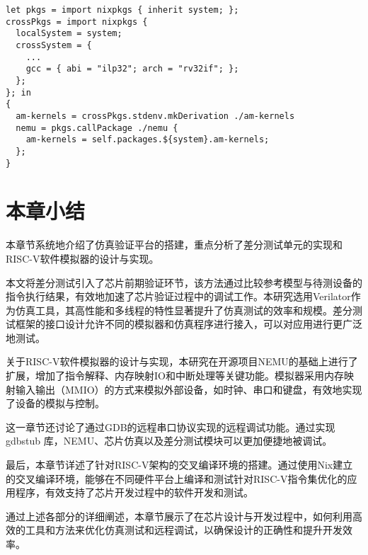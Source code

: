 \begin{lstlisting}[label={lst:nix},captionpos=b,caption={使用Nix管理跨架构依赖}]
let pkgs = import nixpkgs { inherit system; };
crossPkgs = import nixpkgs {
  localSystem = system;
  crossSystem = {
    ...
    gcc = { abi = "ilp32"; arch = "rv32if"; };
  };
}; in
{
  am-kernels = crossPkgs.stdenv.mkDerivation ./am-kernels
  nemu = pkgs.callPackage ./nemu { 
    am-kernels = self.packages.${system}.am-kernels;
  };
}
\end{lstlisting}

\section{本章小结}

本章节系统地介绍了仿真验证平台的搭建，重点分析了差分测试单元的实现和RISC-V软件模拟器的设计与实现。

本文将差分测试引入了芯片前期验证环节，该方法通过比较参考模型与待测设备的指令执行结果，有效地加速了芯片验证过程中的调试工作。本研究选用Verilator作为仿真工具，其高性能和多线程的特性显著提升了仿真测试的效率和规模。差分测试框架的接口设计允许不同的模拟器和仿真程序进行接入，可以对应用进行更广泛地测试。

关于RISC-V软件模拟器的设计与实现，本研究在开源项目NEMU的基础上进行了扩展，增加了指令解释、内存映射IO和中断处理等关键功能。模拟器采用内存映射输入输出（MMIO）的方式来模拟外部设备，如时钟、串口和键盘，有效地实现了设备的模拟与控制。

这一章节还讨论了通过GDB的远程串口协议实现的远程调试功能。通过实现 gdbstub 库，NEMU、芯片仿真以及差分测试模块可以更加便捷地被调试。

最后，本章节详述了针对RISC-V架构的交叉编译环境的搭建。通过使用Nix建立的交叉编译环境，能够在不同硬件平台上编译和测试针对RISC-V指令集优化的应用程序，有效支持了芯片开发过程中的软件开发和测试。

通过上述各部分的详细阐述，本章节展示了在芯片设计与开发过程中，如何利用高效的工具和方法来优化仿真测试和远程调试，以确保设计的正确性和提升开发效率。
